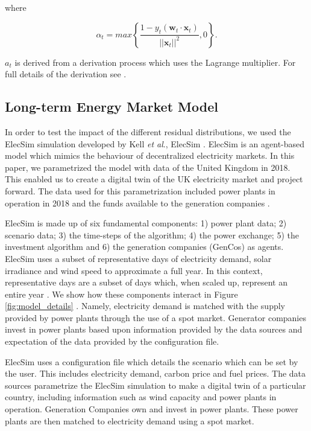 \documentclass[final,3p,times,twocolumn,numbers]{elsarticle}
\begin{document}
\noindent where 

\begin{equation}
\alpha_t=max\left\{\frac{1-y_t(\boldsymbol{w}_t\cdot\boldsymbol{x}_t)}{\left|\left|\boldsymbol{x}_t\right|\right|^2},0\right\}. 	
\end{equation}

\noindent $a_t$ is derived from a derivation process which uses the Lagrange multiplier. For full details of the derivation see \cite{Gzik2014}.

\subsection{Long-term Energy Market Model}


In order to test the impact of the different residual distributions, we used the ElecSim simulation developed by Kell \textit{et al}., ElecSim \cite{Kell,Kell2020}. ElecSim is an agent-based model which mimics the behaviour of decentralized electricity markets. In this paper, we parametrized the model with data of the United Kingdom in 2018. This enabled us to create a digital twin of the UK electricity market and project forward. The data used for this parametrization included power plants in operation in 2018 and the funds available to the generation companies \cite{dukes_511, companies_house}.

ElecSim is made up of six fundamental components: 1) power plant data; 2) scenario data; 3) the time-steps of the algorithm; 4) the power exchange; 5) the investment algorithm and 6) the generation companies (GenCos) as agents. ElecSim uses a subset of representative days of electricity demand, solar irradiance and wind speed to approximate a full year. In this context, representative days are a subset of days which, when scaled up, represent an entire year \cite{Kell2020}. We show how these components interact in Figure \ref{fig:model_details} \cite{Kell}. Namely, electricity demand is matched with the supply provided by power plants through the use of a spot market. Generator companies invest in power plants based upon information provided by the data sources and expectation of the data provided by the configuration file. 



ElecSim uses a configuration file which details the scenario which can be set by the user. This includes electricity demand, carbon price and fuel prices. The data sources parametrize the ElecSim simulation to make a digital twin of a particular country, including information such as wind capacity and power plants in operation. Generation Companies own and invest in power plants. These power plants are then matched to electricity demand using a spot market.
\end{document}
